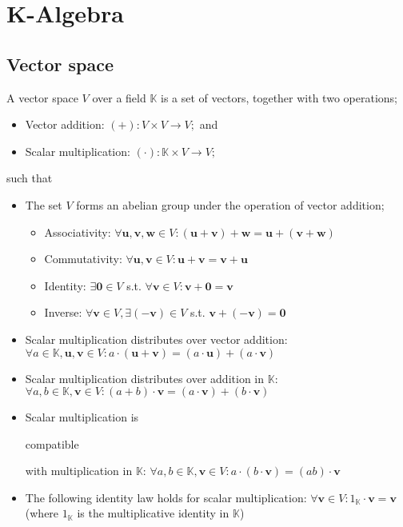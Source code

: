 \documentclass{article}
\newenvironment{itemized}{ 
\begin{itemize}
\setlength{\itemsep}{0pt}
\setlength{\parskip}{0pt}
\setlength{\parsep}{0pt}     
}{\end{itemize}}
\renewcommand{\vec}[1]{\mathbf{#1}}
\begin{document}
\section*{K-Algebra}

\subsection*{Vector space}

A vector space $V$ over a field $\mathbb{K}$ is a set of vectors, together with two operations; 

  \begin{itemized}
    \item Vector addition: $(+) : V \times V \rightarrow V;$ and
    \item Scalar multiplication: $(\cdot) : \mathbb{K} \times V \rightarrow V;$
  \end{itemized}

\noindent such that 
  
  \begin{itemized}
    \item The set $V$ forms an abelian group under the operation of vector addition;
      \begin{itemized}
        \item Associativity: $ \forall \vec{u}, \vec{v}, \vec{w} \in V : (\vec{u} + \vec{v}) + \vec{w} = \vec{u} + (\vec{v} + \vec{w}) $
        \item Commutativity: $ \forall \vec{u}, \vec{v} \in V : \vec{u} + \vec{v} = \vec{v} + \vec{u} $
        \item Identity: $ \exists \vec{0} \in V $ s.t. $ \forall \vec{v} \in V : \vec{v} + \vec{0} = \vec{v} $
        \item Inverse: $ \forall \vec{v} \in V, \exists \vec{(-v)} \in V $ s.t. $ \vec{v} + \vec{(-v)} = \vec{0} $
      \end{itemized}
    \item Scalar multiplication distributes over vector addition: $ \forall a \in \mathbb{K}, \vec{u}, \vec{v} \in V : a \cdot (\vec{u} + \vec{v}) = (a \cdot \vec{u}) + (a \cdot \vec{v}) $
    \item Scalar multiplication distributes over addition in $\mathbb{K}$: $ \forall a, b \in \mathbb{K}, \vec{v} \in V : (a + b) \cdot \vec{v} = (a \cdot \vec{v}) + (b \cdot \vec{v}) $
    \item Scalar multiplication is \begin{em}compatible\end{em} with multiplication in $\mathbb{K}$: $ \forall a,b \in \mathbb{K}, \vec{v} \in V : a \cdot (b \cdot \vec{v}) = (ab) \cdot \vec{v} $ 
    \item The following identity law holds for scalar multiplication: $ \forall \vec{v} \in V : 1_{\mathbb{K}} \cdot \vec{v} = \vec{v} $ (where $1_{\mathbb{K}}$ is the multiplicative identity in $\mathbb{K}$)
  \end{itemized}
\end{document}
